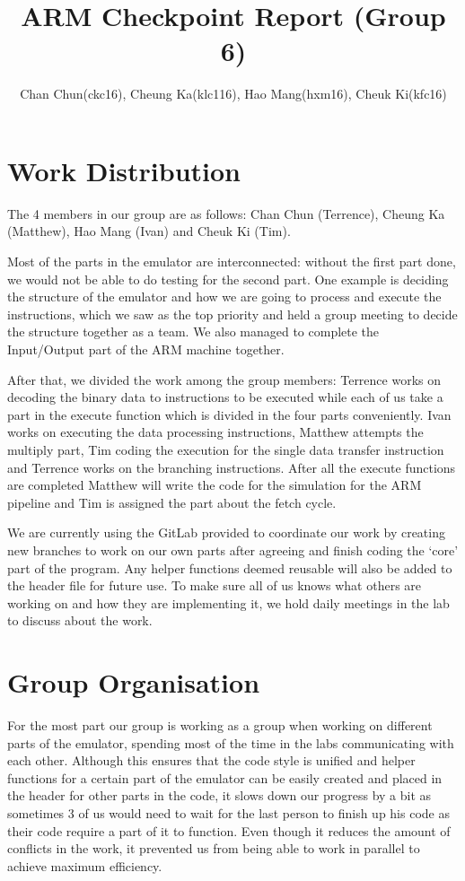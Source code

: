 \documentclass[11pt]{article}
\begin{document}
\title{ARM Checkpoint Report (Group 6) }
\author{Chan Chun(ckc16), Cheung Ka(klc116), Hao Mang(hxm16), Cheuk Ki(kfc16)}

\maketitle

\section{Work Distribution}

The 4 members in our group are as follows: Chan Chun (Terrence), Cheung Ka (Matthew), Hao Mang (Ivan) and Cheuk Ki (Tim).
 
Most of the parts in the emulator are interconnected: without the first part done, we would not be able to do testing for the second part. One example is deciding the structure of the emulator and how we are going to process and execute the instructions, which we saw as the top priority and held a group meeting to decide the structure together as a team. We also managed to complete the Input/Output part of the ARM machine together.
 
After that, we divided the work among the group members: Terrence works on decoding the binary data to instructions to be executed while each of us take a part in the execute function which is divided in the four parts conveniently. Ivan works on executing the data processing instructions, Matthew attempts the multiply part, Tim coding the execution for the single data transfer instruction and Terrence works on the branching instructions. After all the execute functions are completed Matthew will write the code for the simulation for the ARM pipeline and Tim is assigned the part about the fetch cycle.
 
We are currently using the GitLab provided to coordinate our work by creating new branches to work on our own parts after agreeing and finish coding the ‘core’ part of the program. Any helper functions deemed reusable will also be added to the header file for future use. To make sure all of us knows what others are working on and how they are implementing it, we hold daily meetings in the lab to discuss about the work.


\section{Group Organisation}

For the most part our group is working as a group when working on different parts of the emulator, spending most of the time in the labs communicating with each other. Although this ensures that the code style is unified and helper functions for a certain part of the emulator can be easily created and placed in the header for other parts in the code, it slows down our progress by a bit as sometimes 3 of us would need to wait for the last person to finish up his code as their code require a part of it to function. Even though it reduces the amount of conflicts in the work, it prevented us from being able to work in parallel to achieve maximum efficiency. 
 
\end{document}
